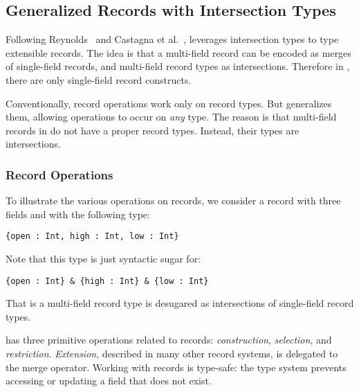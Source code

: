 

\subsection{Generalized Records with Intersection Types}

Following Reynolds~\cite{reynolds1997design} and Castagna et
al.~\cite{castagna1995calculus}, \name leverages intersection types to type
extensible records. The idea is that a multi-field record can be encoded as
merges of single-field records, and multi-field record types as intersections.
Therefore in \name, there are only single-field record constructs. 

Conventionally, record operations work only on record types. But \name
generalizes them, allowing operations to occur on \emph{any} type. The
reason is that multi-field records in \name do not have a proper
record types. Instead, their types are intersections.

\subsubsection{Record Operations}

To illustrate the various operations on records, we consider a record
with three fields and with the following type:

\begin{lstlisting}
{open : Int, high : Int, low : Int} 
\end{lstlisting}

\noindent Note that this type is just syntactic sugar for:

\begin{lstlisting}
{open : Int} & {high : Int} & {low : Int} 
\end{lstlisting}

\noindent That is a multi-field record type is desugared as
intersections of single-field record types.

\name has three primitive operations related to records: \emph{construction},
\emph{selection}, and \emph{restriction}. \emph{Extension}, described in many
other record systems, is delegated to the merge operator. Working with records
is type-safe: the type system prevents accessing or updating a field that does
not exist.

